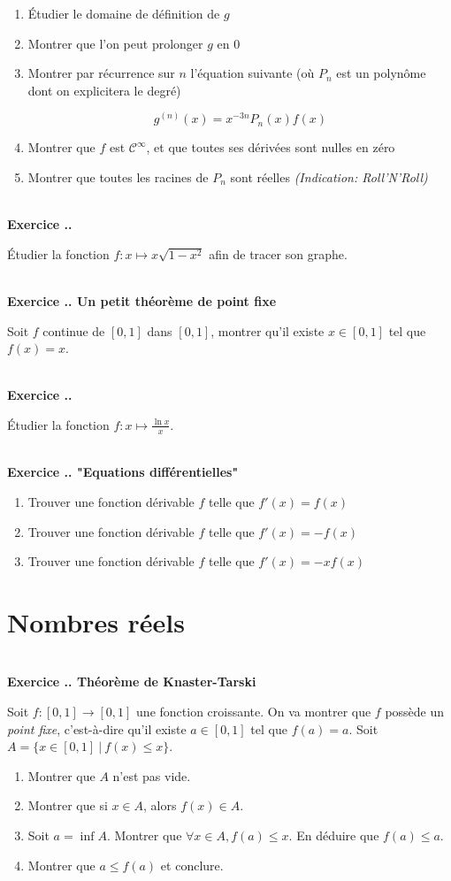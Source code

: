 \documentclass{article}
\newcounter{exo}
\newcommand{\exercice}[1][\null]{\textbf{\\ \large Exercice \thesection.\theexo. \normalsize #1} \addtocounter{exo}{1}}
\begin{document}
\begin{enumerate}
    \item Étudier le domaine de définition de $g$
    \item Montrer que l'on peut prolonger $g$ en $0$
    \item Montrer par récurrence sur $n$ l'équation suivante 
        (où $P_n$ est un polynôme dont on explicitera 
        le degré)

        \begin{equation*}
            g^{(n)} (x) = x^{-3n} P_n (x) f(x) 
        \end{equation*}

    \item Montrer que $f$ est $\mathcal{C}^\infty$, 
        et que toutes ses dérivées sont nulles en zéro

    \item Montrer que toutes les racines de $P_n$ sont 
        réelles \emph{(Indication: Roll'N'Roll)}
\end{enumerate}


\exercice 

Étudier la fonction $f : x \mapsto x \sqrt{1 - x^2}$
afin de tracer son graphe.

\exercice[Un petit théorème de point fixe]

Soit $f$ continue de $ [0,1] $ dans $[0,1]$, montrer qu'il existe 
$x \in [0,1]$ tel que $f(x) = x$.

\exercice

Étudier la fonction $f : x \mapsto \frac{\ln x }{x}$.


\exercice["Equations différentielles"]

\begin{enumerate}
    \item Trouver une fonction dérivable $f$ telle que $f'(x) = f(x)$
    \item Trouver une fonction dérivable $f$ telle que 
        $f'(x) = - f (x)$
    \item Trouver une fonction dérivable $f$ telle que 
        $f'(x) = -x f(x)$
\end{enumerate}

\section{Nombres réels}


\exercice[Théorème de Knaster-Tarski]

Soit $f : [0,1] \rightarrow [0,1]$ une fonction croissante. On va montrer que $f$ possède un \emph{point fixe}, c'est-à-dire qu'il existe $a \in [0,1]$ tel que $f(a) = a$. Soit $A = \{x \in [0,1]~|~f(x)\le x\}$.

\begin{enumerate}

\item Montrer que $A$ n'est pas vide.

\item Montrer que si $x \in A$, alors $f(x) \in A$.

\item Soit $a = \inf A$. Montrer que $\forall x \in A, f(a) \le x$. En déduire que $f(a)\le a$.

\item Montrer que $a \le f(a)$ et conclure.

\end{enumerate}
\end{document}
